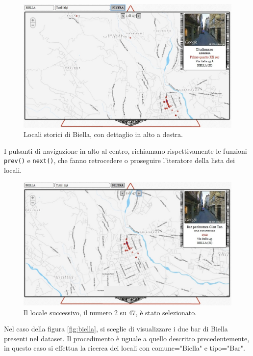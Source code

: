 \begin{figure}[ht!]
	\centering
		\includegraphics[width=\textwidth]{img/s5.jpg}
	\caption{Locali storici di Biella, con dettaglio in alto a destra.}
	\label{fig:biellala}
\end{figure}

I pulsanti di navigazione in alto al centro, richiamano rispettivamente le funzioni \texttt{prev()} e \texttt{next()}, che fanno retrocedere o proseguire l'iteratore della lista dei locali.

\begin{figure}[ht!]
	\centering
		\includegraphics[width=\textwidth]{img/s6.jpg}
	\caption{Il locale successivo, il numero 2 su 47, è stato selezionato.}
	\label{fig:sel}
\end{figure}

Nel caso della figura \ref{fig:biella}, si sceglie di visualizzare i due bar di Biella presenti nel dataset. Il procedimento è uguale a quello descritto precedentemente, in questo caso si effettua la ricerca dei locali con comune="Biella" e tipo="Bar".


